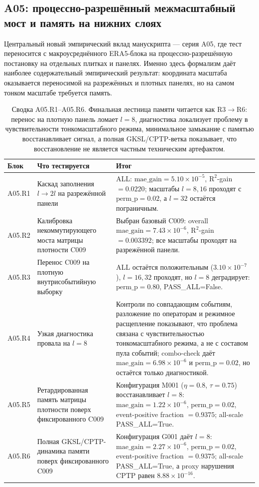 \documentclass[11pt,a4paper]{article}
\theoremstyle{definition}
\theoremstyle{plain}
\theoremstyle{remark}
\begin{document}
\subsection{A05: процессно-разрешённый межмасштабный мост и память на нижних слоях}

Центральный новый эмпирический вклад манускрипта --- серия A05, где тест переносится
с макроусреднённого ERA5-блока на процессно-разрешённую постановку на отдельных плитках и панелях.
Именно здесь формализм даёт наиболее содержательный эмпирический результат:
координата масштаба оказывается переносимой на разрежённых и плотных панелях, но на самом тонком масштабе требуется память.

\begin{table}[t]
\centering
\caption{Сводка A05.R1--A05.R6. Финальная лестница памяти читается как R3$\to$R6: перенос на плотную панель ломает $l=8$, диагностика локализует проблему в чувствительности тонкомасштабного режима, минимальное замыкание с памятью восстанавливает сигнал, а полная GKSL/CPTP-ветка показывает, что восстановление не является частным техническим артефактом.}
\label{tab:A05_summary}
\small
\begin{tabular}{@{}p{1.4cm}p{4.9cm}p{6.0cm}@{}}
\toprule
Блок & Что тестируется & Итог \\
\midrule
A05.R1 & Каскад заполнения $l\to 2l$ на разрежённой панели & ALL: $\mathrm{mae\_gain}=5.10\times10^{-5}$, $\mathrm{R}^2$-gain $=0.0220$; масштабы $l=8,16$ проходят с $\mathrm{perm\_p}=0.02$, а $l=32$ остаётся пограничным. \\
A05.R2 & Калибровка некоммутирующего моста матрицы плотности C009 & Выбран базовый C009: overall $\mathrm{mae\_gain}=7.43\times10^{-6}$, $\mathrm{R}^2$-gain $=0.003392$; все масштабы проходят на разрежённой панели. \\
A05.R3 & Перенос C009 на плотную внутрисобытийную выборку & ALL остаётся положительным ($3.10\times10^{-7}$), $l=16,32$ проходят, но $l=8$ деградирует: $\mathrm{perm\_p}=0.80$, PASS\_ALL=False. \\
A05.R4 & Узкая диагностика провала на $l=8$ & Контроли по совпадающим событиям, разложение по операторам и режимное расщепление показывают, что проблема связана с чувствительностью тонкомасштабного режима, а не с составом пула событий; combo-check даёт $\mathrm{mae\_gain}=6.98\times10^{-6}$ и $\mathrm{perm\_p}=0.02$, но остаётся только диагностикой. \\
A05.R5 & Ретардированная память матрицы плотности поверх фиксированного C009 & Конфигурация M001 ($\eta=0.8$, $\tau=0.75$) восстанавливает $l=8$: $\mathrm{mae\_gain}=1.22\times10^{-6}$, $\mathrm{perm\_p}=0.02$, event-positive fraction $=0.9375$; all-scale PASS\_ALL=True. \\
A05.R6 & Полная GKSL/CPTP-динамика памяти поверх фиксированного C009 & Конфигурация G001 даёт $l=8$: $\mathrm{mae\_gain}=2.27\times10^{-6}$, $\mathrm{perm\_p}=0.02$, event-positive fraction $=0.9375$; all-scale PASS\_ALL=True, а proxy нарушения CPTP равен $8.88\times10^{-16}$. \\
\bottomrule
\end{tabular}
\end{table}
\end{document}
